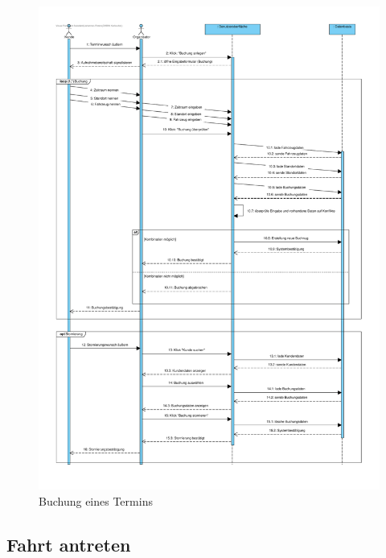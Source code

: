 \begin{figure}[!ht]
    \centering
    \includegraphics[width=\textwidth, height=\textheight-4cm]{Bilder/Diagramme/SD_Buchungsvorgang_01.pdf}
    \caption{Buchung eines Termins}
    \label{img:buchung01}
\end{figure}

\clearpage

\subsection{Fahrt antreten}

